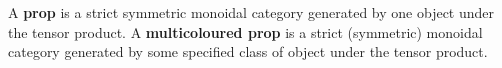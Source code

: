 %
%
%
%
%
%
%
%
%
%
%
%
%


\begin{definition}
\label{def:pro}
A {\bf prop} is a  strict  symmetric monoidal category generated by one object under the tensor product.  A {\bf multicoloured prop} is a strict (symmetric) monoidal category generated by some specified class of object under the tensor product.
\end{definition}


